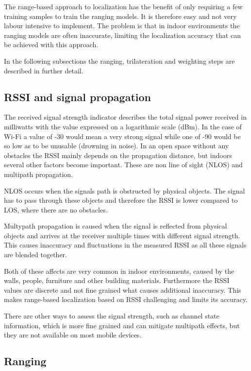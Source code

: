 The range-based approach to localization has the benefit of only requiring  a few training samples to train the ranging models. It is therefore easy and not very labour intensive to implement. The problem is that in indoor environments the ranging models are often inaccurate, limiting the localization accuracy that can be achieved with this approach.

In the following subsections the ranging, trilateration and weighting steps are described in further detail.

\subsection{RSSI and signal propagation}

The received signal strength indicator describes the total signal power received in milliwatts with the value expressed on a logarithmic scale (dBm)\cite[p.~160]{sauter2010gsm}. In the case of Wi-Fi a value of -30 would mean a very strong signal while one of -90 would be so low as to be unusable (drowning in noise). In an open space without any obstacles the RSSI mainly depends on the propagation distance, but indoors several other factors become important. These are non line of sight (NLOS) and multipath propagation.

NLOS occurs when the signals path is obstructed by physical objects. The signal has to pass through these objects and therefore the RSSI is lower compared to LOS, where there are no obstacles\cite{JoseMaster}.

Multypath propagation is caused when the signal is reflected from physical objects and arrives at the receiver multiple times with different signal strength. This causes inaccuracy and fluctuations in the measured RSSI as all these signals are blended together\cite{multipathEffects}.

Both of these affects are very common in indoor environments, caused by the walls, people, furniture and other building materials. Furthermore the RSSI values are discrete and not fine grained what causes additional inaccuracy. This makes range-based localization based on RSSI challenging and limits its accuracy.

There are other ways to assess the signal strength, such as channel state information, which is more fine grained and can mitigate multipath effects, but they are not available on most mobile devices\cite{JoseMaster,FineGrainedIndoorTracking}.

\subsection{Ranging}
\label{Ranging}

